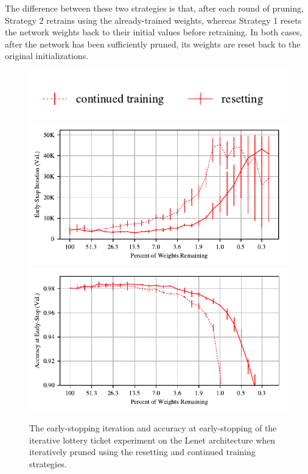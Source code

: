 The difference between these two strategies is that, after each round of pruning, Strategy 2 retrains using the already-trained weights, whereas Strategy 1
resets the network weights back to their initial values before retraining. In both cases, after the network has been sufficiently pruned, its weights 
are reset back to the original initializations.

\begin{figure}
\centering
\includegraphics[width=.3\textwidth]{graphs/mnist/lenet/mnist-han/legend}
\includegraphics[width=.5\textwidth]{graphs/mnist/lenet/mnist-han/iteration}%
\includegraphics[width=.5\textwidth]{graphs/mnist/lenet/mnist-han/accuracy}
\caption{The early-stopping iteration and accuracy at early-stopping of the iterative lottery ticket experiment on the Lenet architecture when iteratively
pruned using the resetting and continued training strategies.}
\label{fig:mnist-han}
\end{figure}

